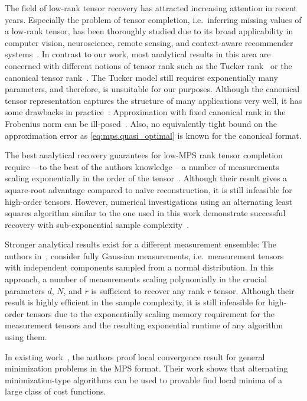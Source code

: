The field of low-rank tensor recovery has attracted increasing attention in recent years.
Especially the problem of tensor completion, i.e.\ inferring missing values of a low-rank tensor, has been thoroughly studied due to its broad applicability in computer vision, neuroscience, remote sensing, and context-aware recommender systems~\cite{Li_2010_Tensor,Zhu_2016_ContextAware,Wang_2014_LowRank}.
In contrast to our work, most analytical results in this area are concerned with different notions of tensor rank such as the Tucker rank~\cite{Kressner_2013_LowRank,Zhang_2016_Cross} or the canonical tensor rank~\cite{Krishnamurthy_2013_LowRank,Potechin_2017_Exact}.
The Tucker model still requires exponentially many parameters, and therefore, is unsuitable for our purposes.
Although the canonical tensor representation captures the structure of many applications very well, it has some drawbacks in practice~\cite{Kolda_2009_Tensor}:
Approximation with fixed canonical rank in the Frobenius norm can be ill-posed~\cite{Silva_Lim}.
Also, no equivalently tight bound on the approximation error as \cref{eq:mps.quasi_optimal} is known for the canonical format.

The best analytical recovery guarantees for low-MPS rank tensor completion require -- to the best of the authors knowledge -- a number of measurements scaling exponentially in the order of the tensor~\cite{Phien_2016_Efficient}.
Although their result gives a square-root advantage compared to na\"ive reconstruction, it is still infeasible for high-order tensors.
However, numerical investigations using an alternating least squares algorithm similar to the one used in this work demonstrate successful recovery with sub-exponential sample complexity~\cite{Grasedyck_2015_Variants,Wang_2016_Tensor}.

Stronger analytical results exist for a different measurement ensemble:
The authors in~\cite{Rauhut_2014_Tensor,Rauhut_2016_Low}, consider fully Gaussian measurements, i.e.\ measurement tensors with independent components sampled from a normal distribution.
In this approach, a number of measurements scaling polynomially in the crucial parameters $d$, $N$, and $r$ is sufficient to recover any rank $r$ tensor.
Although their result is highly efficient in the sample complexity, it is still infeasible for high-order tensors due to the exponentially scaling memory requirement for the measurement tensors and the resulting exponential runtime of any algorithm using them.

In existing work~\cite{Holtz,Rohwedder}, the authors proof local convergence result for general minimization problems in the MPS format.
Their work shows that alternating minimization-type algorithms can be used to provable find local minima of a large class of cost functions.

